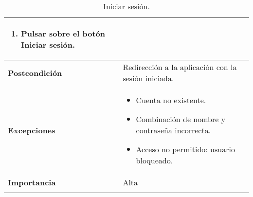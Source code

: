 \begin{longtable}[H]{@{}l|l@{}}
\begin{minipage}[t]{0.71\columnwidth}
\begin{enumerate}
			\def\labelenumi{\arabic{enumi}.}
			\item Pulsar sobre el botón Iniciar sesión.
		\end{enumerate}
	\end{minipage}\tabularnewline
	\midrule
	\begin{minipage}[t]{0.23\columnwidth}\raggedright\strut
		\textbf{Postcondición}\strut
	\end{minipage} & \begin{minipage}[t]{0.71\columnwidth}\raggedright\strut
		Redirección a la aplicación con la sesión iniciada.\strut
	\end{minipage}\tabularnewline
	\midrule
	\begin{minipage}[t]{0.23\columnwidth}\raggedright\strut
		\textbf{Excepciones}\strut
	\end{minipage} & \begin{minipage}[t]{0.71\columnwidth}\raggedright
		\begin{itemize}
			\tightlist
			\item Cuenta no existente.
			\item Combinación de nombre y contraseña incorrecta.
			\item Acceso no permitido: usuario bloqueado.
		\end{itemize}
	\end{minipage}\tabularnewline
	\midrule
	\begin{minipage}[t]{0.23\columnwidth}\raggedright\strut
		\textbf{Importancia}\strut
	\end{minipage} & \begin{minipage}[t]{0.71\columnwidth}\raggedright\strut
		Alta\strut
	\end{minipage}\tabularnewline
	\bottomrule
	\caption{Iniciar sesión.}
	\label{cu:1}
\end{longtable}
\newpage


